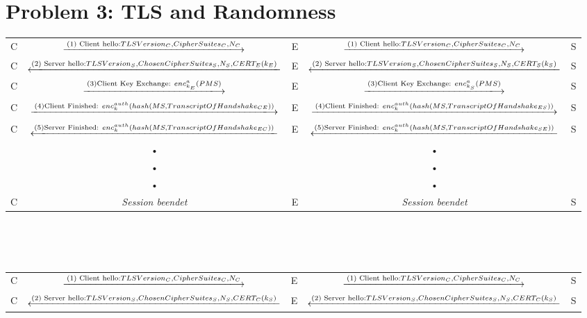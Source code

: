 \documentclass[12pt,pdftex,a4paper]{article}
\begin{document}
\section*{Problem 3: TLS and Randomness}
\begin{sidewaystable}[ph!]
	\begin{tabular}{|c|c|c|c|c|}
		C &  $\xlongrightarrow{\text{(1) Client hello:} TLSVersion_{C},  CipherSuites_{C}, N_{C}}$  & E &  $\xlongrightarrow{\text{(1) Client hello:} TLSVersion_{C},  CipherSuites_{C}, N_{C}}$   & S \\ 
		
		C &  $\xlongleftarrow{\text{(2) Server hello:} TLSVersion_{S},  ChosenCipherSuites_{S}, N_{S}, CERT_{E}(k_{E})}$ & E &  $\xlongleftarrow{\text{(2) Server hello:} TLSVersion_{S},  ChosenCipherSuites_{S}, N_{S}, CERT_{S}(k_{S})}$ & S \\ 
		
		C &  $\xlongrightarrow{\text{(3)Client Key Exchange: } enc^{a}_{k_{E}}(PMS)}$  & E &  $\xlongrightarrow{\text{(3)Client Key Exchange: } enc^{a}_{k_{S}}(PMS)}$  & S \\ 
		
		C &  $\xlongrightarrow{\text{(4)Client Finished: } enc_{k}^{auth}(hash(MS, TranscriptOfHandshake_{CE}))}$  & E &  $\xlongrightarrow{\text{(4)Client Finished: } enc_{k}^{auth}(hash(MS, TranscriptOfHandshake_{ES}))}$  & S \\ 
		
		C &  $\xlongleftarrow{\text{(5)Server Finished: } enc_{k}^{auth}(hash(MS, TranscriptOfHandshake_{EC}))}$ & E &  $\xlongleftarrow{\text{(5)Server Finished: } enc_{k}^{auth}(hash(MS, TranscriptOfHandshake_{SE}))}$ & S \\ 
		& • &  & • &  \\ 
		& • &  & • &  \\ 
		& • &  & • &  \\ 
		C & \textit{Session beendet} & E & \textit{Session beendet} & S \\ 
	\end{tabular} 
	\\\\
	\\
	\begin{tabular}{|c|c|c|c|c|}
		C &  $\xlongrightarrow{\text{(1) Client hello:} TLSVersion_{C},  CipherSuites_{C}, N_{C}}$  & E &  $\xlongrightarrow{\text{(1) Client hello:} TLSVersion_{C},  CipherSuites_{C}, N_{C}}$   & S \\ 
		
		C &  $\xlongleftarrow{\text{(2) Server hello:} TLSVersion_{S},  ChosenCipherSuites_{S}, N_{S}, CERT_{C}(k_{S})}$ & E &  $\xlongleftarrow{\text{(2) Server hello:} TLSVersion_{S},  ChosenCipherSuites_{S}, N_{S}, CERT_{C}(k_{S})}$ & S \\ 
		

\end{tabular}
\end{sidewaystable}
\end{document}

